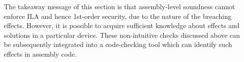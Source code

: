 The takeaway message of this section is that assembly-level soundness cannot enforce ILA and hence 1st-order security, due to the nature of the breaching effects. However, it is possible to acquire sufficient knowledge about effects and solutions in a particular device. These non-intuitive checks discussed above can be subsequently integrated into a code-checking tool which can identify such effects in assembly code.
